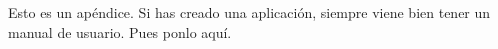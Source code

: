 \documentclass[a4paper, 12pt]{book}
\begin{document}
Esto es un apéndice.
Si has creado una aplicación, siempre viene bien tener un manual de usuario.
Pues ponlo aquí.


\cleardoublepage


\nocite{*}
\end{document}
